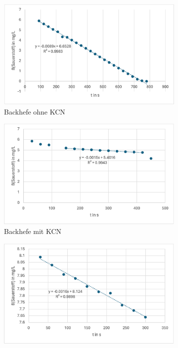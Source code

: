 \documentclass[10pt,a4paper]{article}
\begin{document}
		\begin{figure}[H]
		\centering
		\begin{subfigure}[b]{0.5\textwidth}
			\includegraphics[width=\textwidth]{O2hefeohneKCN.png}
			\caption{Backhefe ohne KCN}
			\label{fig:hefeohneKCN}
		\end{subfigure}
		\hfill
		\begin{subfigure}[b]{0.5\textwidth}
			\includegraphics[width=\textwidth]{O2hefemitKCN.png}
			\caption{Backhefe mit KCN}
			\label{fig:hefemitKCN}
		\end{subfigure}
		\begin{subfigure}[b]{0.5\textwidth}
			\includegraphics[width=\textwidth]{O2BY2ohneKCN.png}

\end{subfigure}
\end{figure}
\end{document}
